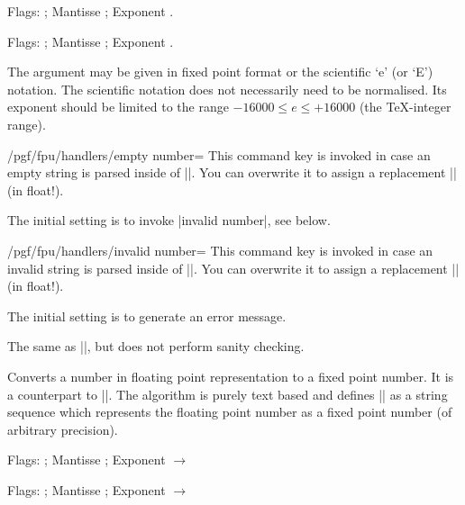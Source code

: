 \begin{command}{\pgfmathfloatparsenumber{}}
\begin{codeexample}[]
\pgfmathfloattomacro{\pgfmathresult}{\F}{\M}{\E}
Flags: \F; Mantisse \M; Exponent \E.
\end{codeexample}

\begin{codeexample}[]
\pgfmathfloattomacro{\pgfmathresult}{\F}{\M}{\E}
Flags: \F; Mantisse \M; Exponent \E.
\end{codeexample}
	The argument  may be given in fixed point format or the scientific `e' (or `E') notation. The scientific notation does not necessarily need to be normalised. Its exponent should be limited to the range $-16000 \le e \le +16000$ (the \TeX-integer range).
\end{command}

\begin{key}{/pgf/fpu/handlers/empty number=}
	This command key is invoked in case an empty string is parsed inside of |\pgfmathfloatparsenumber|. You can overwrite it to assign a replacement |\pgfmathresult| (in float!).

	The initial setting is to invoke |invalid number|, see below.
\end{key}
\begin{key}{/pgf/fpu/handlers/invalid number=}
	This command key is invoked in case an invalid string is parsed inside of |\pgfmathfloatparsenumber|. You can overwrite it to assign a replacement |\pgfmathresult| (in float!).

	The initial setting is to generate an error message.
\end{key}

\begin{command}{\pgfmathfloatqparsenumber{}}
	The same as |\pgfmathfloatparsenumber|, but does not perform sanity checking.
\end{command}

\begin{command}{}
	Converts a number in floating point representation to a fixed point number. It is a counterpart to |\pgfmathfloatparsenumber|. The algorithm is purely text based and defines |\pgfmathresult| as a string sequence which represents the floating point number  as a fixed point number (of arbitrary precision).

\begin{codeexample}[]
\pgfmathfloattomacro{\pgfmathresult}{\F}{\M}{\E}
Flags: \F; Mantisse \M; Exponent \E
$\to$ 
\pgfmathfloattofixed{\pgfmathresult}
\pgfmathresult
\end{codeexample}

\begin{codeexample}[]
\pgfmathfloattomacro{\pgfmathresult}{\F}{\M}{\E}
Flags: \F; Mantisse \M; Exponent \E
$\to$
\pgfmathfloattofixed{\pgfmathresult}
\pgfmathresult 
\end{codeexample}
\end{command}

